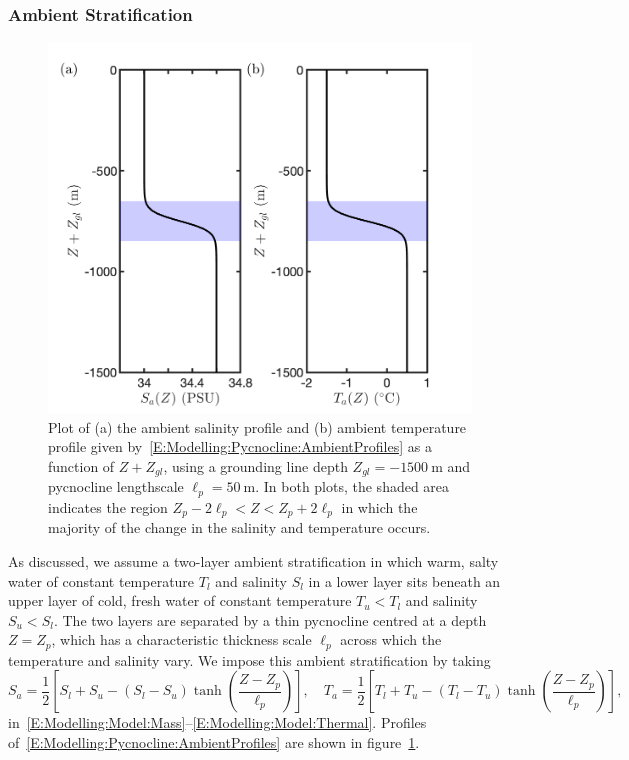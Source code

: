 \documentclass[openacc]{rsproca_new}%
\newcommand{\red}[1]{{\color{red} #1}}
\newcommand{\rout}[1]{\red{\st{#1}}}\newcommand{\ab}[1]{\textcolor{Green}{#1}}\newcommand{\about}[1]{\textcolor{Cyan}{\sout{#1}}}
\renewcommand{\rout}[1]{{}} %
\renewcommand{\red}[1]{{}} %
\begin{document}
\subsubsection{Ambient Stratification}\label{S:Model:Pycnocline}
\begin{figure}
\centering
\includegraphics[scale =0.4]{./make_plots/plots/figure2.png}
\caption{Plot of (a) the ambient salinity profile and (b) ambient temperature profile given by~\eqref{E:Modelling:Pycnocline:AmbientProfiles} as a function of \rout{distance above sea level,} $Z + Z_{gl}$, using a grounding line depth $Z_{gl} = -1500~\si{\meter}$ and pycnocline lengthscale $\ell_p = 50~\si{\meter}$. In both plots, the shaded area indicates the region $Z_p - 2\ell_p < Z < Z_p + 2\ell_p$ in which the majority of the change in the salinity and temperature occurs.}\label{fig:Pycnocline_Profiles}
\end{figure}

As discussed, we assume a two-layer ambient stratification in which warm, salty water of constant temperature $T_l$ and salinity $S_l$ in a lower layer sits beneath an upper layer of cold, fresh water of constant temperature $T_u < T_l$ and salinity $S_u < S_l$. The two layers are separated by a thin pycnocline centred at a depth $Z = Z_p$, which has a characteristic thickness scale $\ell_p$ across which the temperature and salinity vary. We impose this ambient stratification by taking
\begin{equation}\label{E:Modelling:Pycnocline:AmbientProfiles}
S_a = \frac{1}{2}\left[S_l + S_u - (S_l - S_u)\tanh\left(\frac{Z - Z_p}{\ell_p}\right)\right], \quad
T_a = \frac{1}{2}\left[T_l + T_u - (T_l - T_u)\tanh\left(\frac{Z - Z_p}{\ell_p}\right)\right],
\end{equation} %
in~\eqref{E:Modelling:Model:Mass}--\eqref{E:Modelling:Model:Thermal}. Profiles of~\eqref{E:Modelling:Pycnocline:AmbientProfiles} are shown in figure~\ref{fig:Pycnocline_Profiles}. 
\end{document}
